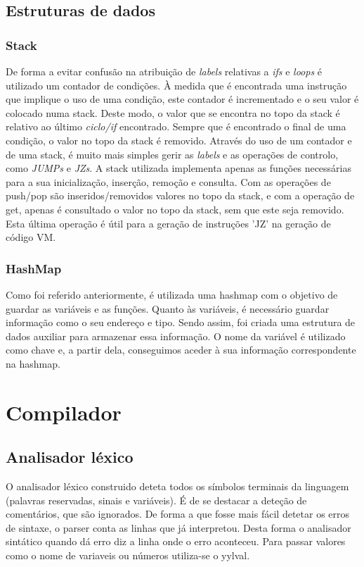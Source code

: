 \documentclass[a4paper,10pt]{report}
\begin{document}
\section{Estruturas de dados}

\subsection{Stack}
      De forma a evitar confusão na atribuição de \emph{labels} relativas a \emph{ifs} e \emph{loops} é utilizado um contador de condições. À medida que é encontrada uma instrução que implique o uso de uma condição, este contador é incrementado e o seu valor é colocado numa stack. Deste modo, o valor que se encontra no topo da stack é relativo ao último \emph{ciclo/if} encontrado. Sempre que é encontrado o final de uma condição, o valor no topo da stack é removido. Através do uso de um contador e de uma stack, é muito mais simples gerir as \emph{labels} e as operações de controlo, como \emph{JUMPs} e \emph{JZs}.
      A stack utilizada implementa apenas as funções necessárias para a sua inicialização, inserção, remoção e consulta. Com as operações de push/pop são inseridos/removidos valores no topo da stack, e com a operação de get, apenas é consultado o valor no topo da stack, sem que este seja removido. Esta última operação é útil para a geração de instruções 'JZ' na geração de código VM.

\subsection{HashMap}
	Como foi referido anteriormente, é utilizada uma hashmap com o objetivo de guardar as variáveis e as funções. Quanto às variáveis, é necessário guardar informação como o seu endereço e tipo. Sendo assim, foi criada uma estrutura de dados auxiliar para armazenar essa informação. O nome da variável é utilizado como chave e, a partir dela, conseguimos aceder à sua informação correspondente na hashmap. 


\chapter{Compilador}


\section{Analisador léxico}
  O analisador léxico construido deteta todos os símbolos terminais da linguagem (palavras reservadas, sinais e variáveis).
  É de se destacar a deteção de comentários, que são ignorados.
  De forma a que fosse mais fácil detetar os erros de sintaxe, o parser conta as linhas que já interpretou. Desta forma o analisador sintático quando dá erro diz a linha onde o erro aconteceu.  
  Para passar valores como o nome de variaveis ou números utiliza-se o yylval.
\end{document}
